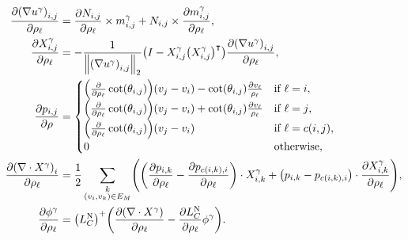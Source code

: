 \begin{align*}
	\frac{\partial \pof{\nabla u^\gamma}_{i, j}}{\partial \rho_\ell} &= \frac{\partial N_{i, j}}{\partial \rho_\ell} \times m^\gamma_{i, j} + N_{i, j} \times \frac{\partial m^\gamma_{i, j}}{\partial \rho_\ell}, \\
	\frac{\partial X^\gamma_{i, j}}{\partial \rho_\ell} &= -\frac{1}{\norm{\pof{\nabla u^\gamma}_{i, j}}_2}\pof{I - X^\gamma_{i, j}\pof{X^\gamma_{i, j}}^\intercal}\frac{\partial \pof{\nabla u^\gamma}_{i, j}}{\partial \rho_\ell}, \\
	\frac{\partial p_{i, j}}{\partial \rho} &= \begin{cases}
		\pof{\frac{\partial}{\partial \rho_\ell}\cot\pof{\theta_{i, j}}}\pof{v_j - v_i} - \cot\pof{\theta_{i, j}}\frac{\partial v_\ell}{\rho_\ell} & \text{if \(\ell = i\)}, \\
		\pof{\frac{\partial}{\partial \rho_\ell}\cot\pof{\theta_{i, j}}}\pof{v_j - v_i} + \cot\pof{\theta_{i, j}}\frac{\partial v_\ell}{\rho_\ell} & \text{if \(\ell = j\)}, \\
		\pof{\frac{\partial}{\partial \rho_\ell}\cot\pof{\theta_{i, j}}}\pof{v_j - v_i} & \text{if \(\ell = c\pof{i, j}\)}, \\
		0 & \text{otherwise},
	\end{cases} \\
	\frac{\partial \pof{\nabla \cdot X^\gamma}_i}{\partial \rho_\ell} &= \frac{1}{2}\sum_{\substack{k \\ \pof{v_i, v_k} \in E_M}}\pof{\pof{\frac{\partial p_{i, k}}{\partial \rho_\ell} - \frac{\partial p_{c\pof{i, k}, i}}{\partial \rho_\ell}} \cdot X^\gamma_{i, k} + \pof{p_{i, k} - p_{c\pof{i, k}, i}} \cdot \frac{\partial X^\gamma_{i, k}}{\partial \rho_\ell}}, \\
	\frac{\partial \phi^\gamma}{\partial \rho_\ell} &= \pof{L_C^{\text{N}}}^+\pof{\frac{\partial \pof{\nabla \cdot X^\gamma}}{\partial \rho_\ell} - \frac{\partial L_C^{\text{N}}}{\partial \rho_\ell}\phi^\gamma}.
\end{align*}
